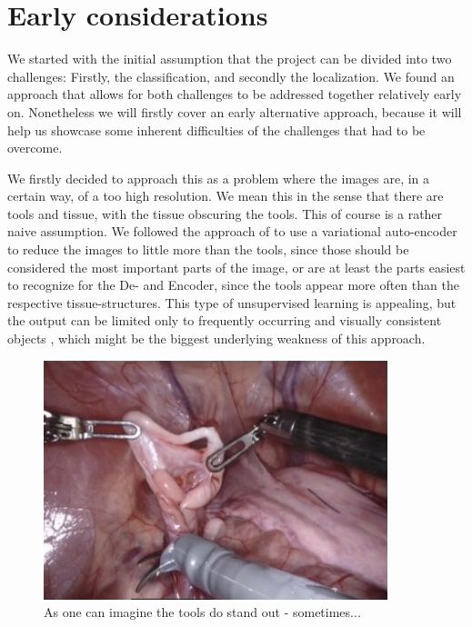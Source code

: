 \section{Early considerations}

We started with the initial assumption that the project can be divided into two challenges: Firstly, the classification, and secondly the localization. We found an approach that allows for both challenges to be addressed together relatively early on. Nonetheless we will firstly cover an early alternative approach, because it will help us showcase some inherent difficulties of the challenges that had to be overcome.

We firstly decided to approach this as a problem where the images are, in a certain way, of a too high resolution. We mean this in the sense that there are tools and tissue, with the tissue obscuring the tools. This of course is a rather naive assumption. We followed the approach of \cite{https://doi.org/10.48550/arxiv.1512.03385} to use a variational auto-encoder to reduce the images to little more than the tools, since those should be considered the most important parts of the image, or are at least the parts easiest to recognize for the De- and Encoder, since the tools appear more often than the respective tissue-structures. This type of unsupervised learning is appealing, but the output can be limited only to frequently occurring and visually consistent objects \citep{localization_free}, which might be the biggest underlying weakness of this approach.

\begin{figure}[H]
	\centering
	\includegraphics[width=10cm]{3_methodology/Tools}
	\caption{As one can imagine the tools do stand out - sometimes...}
	\label{fig:Tools_Good}
\end{figure}

